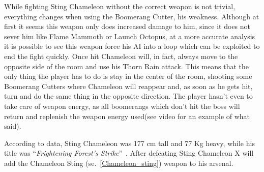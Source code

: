While fighting Sting Chameleon without the correct weapon is not trivial, everything changes when using the Boomerang Cutter, his weakness. Although at first it seems this weapon only does increased damage to him, since it does not sever him like Flame Mammoth or Launch Octopus, at a more accurate analysis it is possible to see this weapon force his AI into a loop which can be exploited to end the fight quickly. Once hit Chameleon will, in fact, always move to the opposite side of the room and use his Thorn Rain attack. This means that the only thing the player has to do is stay in the center of the room, shooting some Boomerang Cutters where Chameleon will reappear and, as soon as he gets hit, turn and do the same thing in the opposite direction. The player hasn't even to take care of weapon energy, as all boomerangs which don't hit the boss will return and replenish the weapon energy used(see video  for an example of what said).  

According to data, Sting Chameleon was 177 cm tall and 77 Kg heavy, while his title was ``\textit{Frightening Forest's Strike}''~\cite{book:MMX_Complete_art}.
After defeating Sting Chameleon X will add the Chameleon Sting (se.~\ref{Chameleon_sting}) weapon to his arsenal.

